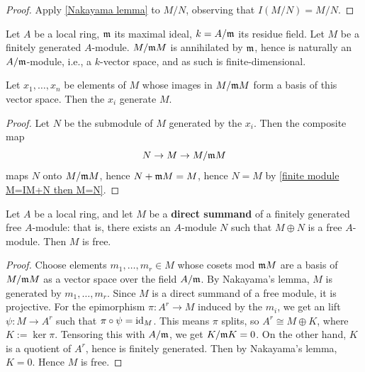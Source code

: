 \begin{proof}
Apply \cref{Nakayama lemma} to $M/N$, observing that $I(M/N)=M/N$.
\end{proof}
Let $A$ be a local ring, $\mathfrak{m}$ its maximal ideal, $k=A/\mathfrak{m}$ its residue field. Let $M$ be a finitely generated $A$-module. $M/\mathfrak{m} M$ is annihilated by $\mathfrak{m}$, hence is naturally an $A/\mathfrak{m}$-module, i.e., a $k$-vector space, and as such is finite-dimensional.
\begin{proposition}\label{module generating set in M/mM}
Let $x_1,\dots,x_n$ be elements of $M$ whose images in $M/\mathfrak{m} M$ form a basis of this vector space. Then the $x_i$ generate $M$.
\end{proposition}
\begin{proof}
Let $N$ be the submodule of $M$ generated by the $x_i$. Then the composite
map
\[N\to M\to M/\mathfrak{m} M\]
maps $N$ onto $M/\mathfrak{m} M$, hence $N+\mathfrak{m} M=M$, hence $N=M$ by \cref{finite module M=IM+N then M=N}.
\end{proof}
\begin{proposition}\label{local ring module direct summand is free}
Let $A$ be a local ring, and let $M$ be a \textbf{direct summand} of a finitely generated free $A$-module: that is, there exists an $A$-module $N$ such that $M\oplus N$ is a free $A$-module. Then $M$ is free.
\end{proposition}
\begin{proof}
Choose elements $m_1,\dots,m_r\in M$ whose cosets mod $\mathfrak{m} M$ are a basis of $M/\mathfrak{m} M$ as a vector space over the field $A/\mathfrak{m}$. By Nakayama's lemma, $M$ is generated by $m_1,\dots,m_r$. Since $M$ is a direct summand of a free module, it is projective. For the epimorphism $\pi:A^r\to M$ induced by the $m_i$, we get an lift $\psi:M\to A^r$ such that $\pi\circ\psi=\operatorname{id}_M$. This means $\pi$ splits, so $A^r\cong M\oplus K$, where $K:=\ker\pi$. Tensoring this with $A/\mathfrak{m}$, we get $K/\mathfrak{m} K=0$. On the other hand, $K$ is a quotient of $A^r$, hence is finitely generated. Then by Nakayama's lemma, $K=0$. Hence $M$ is free.
\end{proof}
